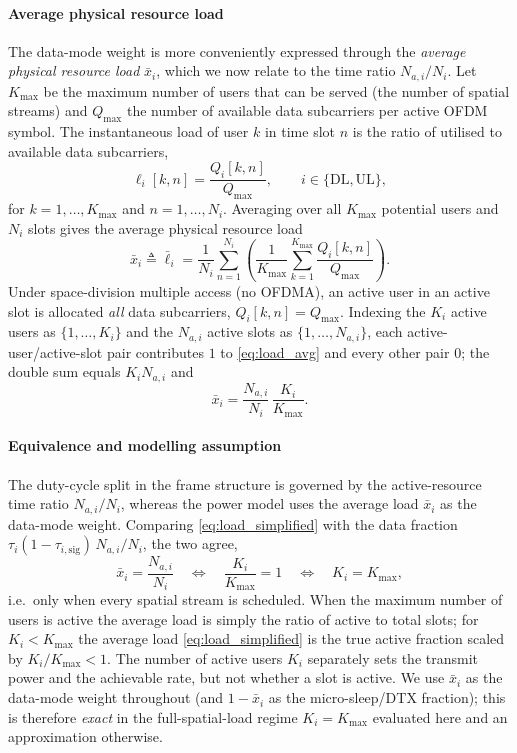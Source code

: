 \paragraph{Average physical resource load}
The data-mode weight is more conveniently expressed through the
\emph{average physical resource load} $\bar x_i$, which we now relate to the
time ratio $N_{a,i}/N_i$. Let $K_{\max}$ be the maximum number of users that can
be served (the number of spatial streams) and $Q_{\max}$ the number of available
data subcarriers per active OFDM symbol. The instantaneous load of user $k$ in
time slot $n$ is the ratio of utilised to available data subcarriers,
\begin{equation}
\label{eq:load_inst}
\ell_i[k,n] = \frac{Q_i[k,n]}{Q_{\max}},\qquad i\in\{\mathrm{DL},\mathrm{UL}\},
\end{equation}
for $k=1,\dots,K_{\max}$ and $n=1,\dots,N_i$. Averaging over all $K_{\max}$
potential users and $N_i$ slots gives the average physical resource load
\begin{equation}
\label{eq:load_avg}
\bar x_i \triangleq \bar\ell_i
= \frac{1}{N_i}\sum_{n=1}^{N_i}\left(
\frac{1}{K_{\max}}\sum_{k=1}^{K_{\max}}\frac{Q_i[k,n]}{Q_{\max}}\right).
\end{equation}
Under space-division multiple access (no OFDMA), an active user in an active
slot is allocated \emph{all} data subcarriers, $Q_i[k,n]=Q_{\max}$. Indexing the
$K_i$ active users as $\{1,\dots,K_i\}$ and the $N_{a,i}$ active slots as
$\{1,\dots,N_{a,i}\}$, each active-user/active-slot pair contributes $1$ to
\eqref{eq:load_avg} and every other pair $0$; the double sum equals $K_i N_{a,i}$
and
\begin{equation}
\label{eq:load_simplified}
\bar x_i = \frac{N_{a,i}}{N_i}\,\frac{K_i}{K_{\max}}.
\end{equation}

\paragraph{Equivalence and modelling assumption}
The duty-cycle split in the frame structure is governed by the active-resource
time ratio $N_{a,i}/N_i$, whereas the power model uses the average load $\bar
x_i$ as the data-mode weight. Comparing \eqref{eq:load_simplified} with the data
fraction $\tau_i(1-\tau_{i,\mathrm{sig}})\,N_{a,i}/N_i$, the two agree,
\begin{equation}
\label{eq:equiv}
\bar x_i = \frac{N_{a,i}}{N_i}
\quad\Longleftrightarrow\quad
\frac{K_i}{K_{\max}} = 1
\quad\Longleftrightarrow\quad
K_i = K_{\max},
\end{equation}
i.e.\ only when every spatial stream is scheduled. When the maximum number of
users is active the average load is simply the ratio of active to total slots;
for $K_i<K_{\max}$ the average load \eqref{eq:load_simplified} is the true active
fraction scaled by $K_i/K_{\max}<1$. The number of active users $K_i$ separately
sets the transmit power and the achievable rate, but not whether a slot is
active. We use $\bar x_i$ as the data-mode weight throughout (and $1-\bar x_i$ as
the micro-sleep/DTX fraction); this is therefore \emph{exact} in the
full-spatial-load regime $K_i=K_{\max}$ evaluated here and an approximation
otherwise.


